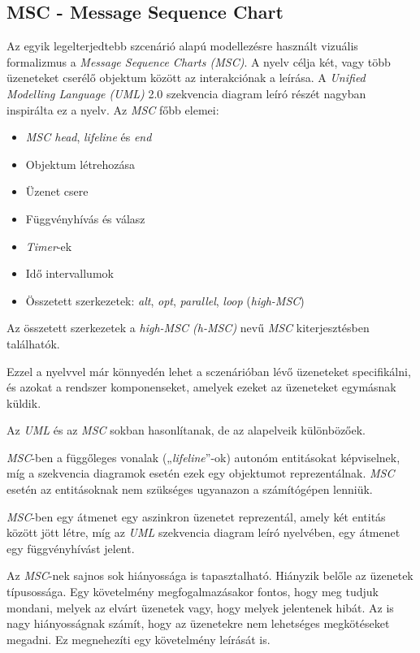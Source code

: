 \subsection{MSC - Message Sequence Chart}

Az egyik legelterjedtebb szcenárió alapú modellezésre használt vizuális formalizmus a \textit{Message Sequence Charts (MSC)}.
A nyelv célja két, vagy több üzeneteket cserélő objektum között az interakciónak a leírása.
A \textit{Unified Modelling Language (UML)} 2.0 szekvencia diagram leíró részét nagyban inspirálta ez a nyelv.
Az \textit{MSC} főbb elemei:

\begin{itemize}
\item \textit{MSC head}, \textit{lifeline} és \textit{end}
\item Objektum létrehozása
\item Üzenet csere
\item Függvényhívás és válasz
\item \textit{Timer}-ek
\item Idő intervallumok
\item Összetett szerkezetek: \textit{alt}, \textit{opt}, \textit{parallel}, \textit{loop} (\textit{high-MSC})
\end{itemize}

Az összetett szerkezetek a \textit{high-MSC (h-MSC)} nevű \textit{MSC} kiterjesztésben találhatók.

Ezzel a nyelvvel már könnyedén lehet a sczenárióban lévő üzeneteket specifikálni, és azokat a rendszer komponenseket, amelyek ezeket az üzeneteket egymásnak küldik.

Az \textit{UML} és az \textit{MSC} sokban hasonlítanak, de az alapelveik különbözőek.

\textit{MSC}-ben a függőleges vonalak („\textit{lifeline}”-ok) autonóm entitásokat képviselnek, míg a szekvencia diagramok esetén ezek egy objektumot reprezentálnak.
\textit{MSC} esetén az entitásoknak nem szükséges ugyanazon a számítógépen lenniük.

\textit{MSC}-ben egy átmenet egy aszinkron üzenetet reprezentál, amely két entitás között jött létre, míg az \textit{UML} szekvencia diagram leíró nyelvében, egy átmenet egy függvényhívást jelent.

Az \textit{MSC}-nek sajnos sok hiányossága is tapasztalható.
Hiányzik belőle az üzenetek típusossága.
Egy követelmény megfogalmazásakor fontos, hogy meg tudjuk mondani, melyek az elvárt üzenetek vagy, hogy melyek jelentenek hibát.
Az is nagy hiányosságnak számít, hogy az üzenetekre nem lehetséges megkötéseket megadni.
Ez megnehezíti egy követelmény leírását is.

